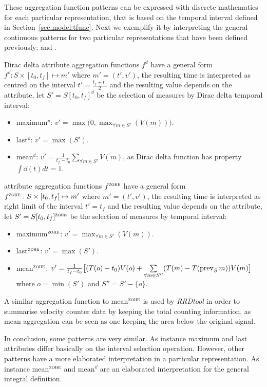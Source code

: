 These aggregation function patterns can be expressed with discrete
mathematics for each particular representation, that is based on the
temporal interval defined in Section~\ref{sec:model:tfunc}. Next we
exemplify it by interpreting the general continuous patterns for two
particular representations that have been defined previously: \dd{}
and \zohe{}.


Dirac delta attribute aggregation functions $f^\dd$ have a general
form $f^\dd : S \times [t_0,t_f]\mapsto m'$ where $m'=(t',v')$, the
resulting time is interpreted as centred on the interval
$t'=\frac{t_f+t_0}{2}$ and the resulting value depends on the
attribute, let $S'=S[t_0,t_f]^\dd$ be the selection of measures by
Dirac delta temporal interval:
\begin{itemize}
\item maximum$^\dd$: $v' = \max\big(0,\max_{\forall m \in S'}(V(m))\big)$. 
\item last$^\dd$: $v' = \max(S')$.
\item mean$^\dd$: $v' = \frac{1}{t_f-t_0} \sum\limits_{\forall m
    \in S'} V(m)$, as Dirac delta function has property $\int\dd(t)dt=1$.
\end{itemize}


\zohe{} attribute aggregation functions $f^\zohe{}$ have a general
form $f^\zohe{} : S \times [t_0,t_f]\mapsto m'$ where $m'=(t',v')$,
the resulting time is interpreted as right limit of the interval
$t'=t_f$ and the resulting value depends on the attribute, let
$S'=S[t_0,t_f]^\zohe{}$ be the selection of measures by \zohe{} temporal
interval:
\begin{itemize}
\item maximum$^\zohe{}$: $v' = \max_{\forall m \in S'}(V(m))$. 
\item last$^\zohe{}$: $v' = \max(S')$.
\item mean$^\zohe{}$: $v' = \frac{1}{t_f-t_0} \big[ (T(o)-t_0)V(o) +
  \sum\limits_{\forall m \in S''}( T(m)- T(\operatorname*{prev}_S
  m) )V(m) \big]$ where $o=\min(S')$ and $S''= S' - \{o\}$.
\end{itemize}

A similar aggregation function to mean$^\zohe{}$ is used by \emph{RRDtool}
\cite{rrdtool} in order to summarise velocity coun\-ter
data by keeping the total counting information, as mean aggregation
can be seen as one keeping the area below the original signal.


In conclusion, some patterns are very similar. As instance maximum and
last attributes differ basically on the interval selection
operation. However, other patterns have a more elaborated
interpretation in a particular representation. As instance
mean$^\zohe{}$ and mean$^\dd$ are an elaborated interpretation for
the general integral definition.





